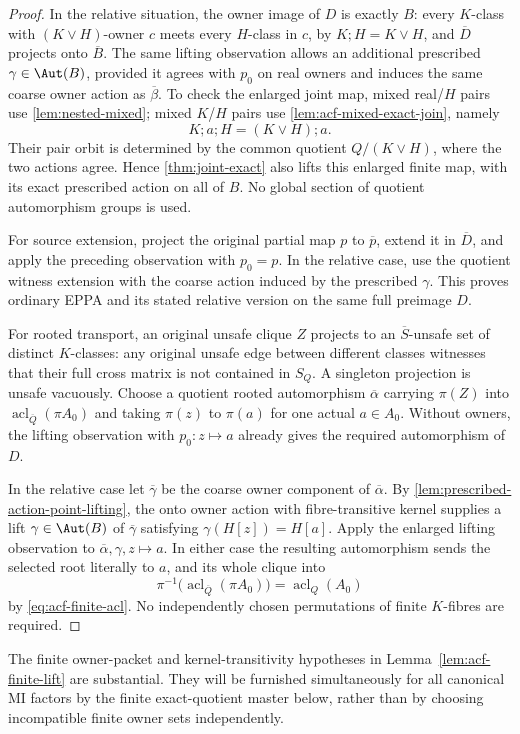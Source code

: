 \begin{proof}
In the relative situation, the owner image of \(D\) is exactly
\(B\): every \(K\)-class with \((K\vee H)\)-owner \(c\)
meets every \(H\)-class in \(c\), by \(K;H=K\vee H\), and
\(\overline D\) projects onto \(\overline B\). The same lifting
observation allows an additional prescribed
\(\gamma\in\Aut(B)\), provided it agrees with \(p_0\) on
real owners and induces the same coarse owner action as
\(\overline\beta\). To check the enlarged joint map, mixed
real/\(H\) pairs use \cref{lem:nested-mixed}; mixed
\(K\)/\(H\) pairs use \cref{lem:acf-mixed-exact-join}, namely
\[
                  K;a;H=(K\vee H);a.
\]
Their pair orbit is determined by the common quotient
\(Q/(K\vee H)\), where the two actions agree. Hence
\cref{thm:joint-exact} also lifts this enlarged finite map,
with its exact prescribed action on all of \(B\).
No global section of quotient automorphism groups is used.

For source extension, project the original partial map \(p\)
to \(\overline p\), extend it in \(\overline D\), and apply
the preceding observation with \(p_0=p\). In the relative case,
use the quotient witness extension with the coarse action
induced by the prescribed \(\gamma\). This proves ordinary EPPA
and its stated relative version on the same full preimage \(D\).

For rooted transport, an original unsafe clique \(Z\) projects
to an \(\overline S\)-unsafe set of distinct \(K\)-classes:
any original unsafe edge between different classes witnesses
that their full cross matrix is not contained in \(S_Q\).
A singleton projection is unsafe vacuously. Choose a quotient
rooted automorphism \(\overline\alpha\) carrying \(\pi(Z)\)
into \(\operatorname{acl}_{\overline Q}(\pi A_0)\) and taking
\(\pi(z)\) to \(\pi(a)\) for one actual \(a\in A_0\).
Without owners, the lifting observation with \(p_0:z\mapsto a\)
already gives the required automorphism of \(D\).

In the relative case let \(\overline\gamma\) be the coarse
owner component of \(\overline\alpha\). By
\cref{lem:prescribed-action-point-lifting}, the onto owner action
with fibre-transitive kernel supplies a lift
\(\gamma\in\Aut(B)\) of \(\overline\gamma\) satisfying
\(\gamma(H[z])=H[a]\). Apply
the enlarged lifting observation to
\(\overline\alpha,\gamma,z\mapsto a\).
In either case the resulting automorphism sends the selected
root literally to \(a\), and its whole clique into
\[
 \pi^{-1}\bigl(\operatorname{acl}_{\overline Q}(\pi A_0)\bigr)
                  =\operatorname{acl}_Q(A_0)
\]
by \eqref{eq:acf-finite-acl}. No independently chosen
permutations of finite \(K\)-fibres are required.
\end{proof}

\begin{remark}
The finite owner-packet and kernel-transitivity
hypotheses in Lemma~\ref{lem:acf-finite-lift}
are substantial.  They will be furnished
simultaneously for all canonical MI factors by
the finite exact-quotient master below, rather
than by choosing incompatible finite owner
sets independently.
\end{remark}
